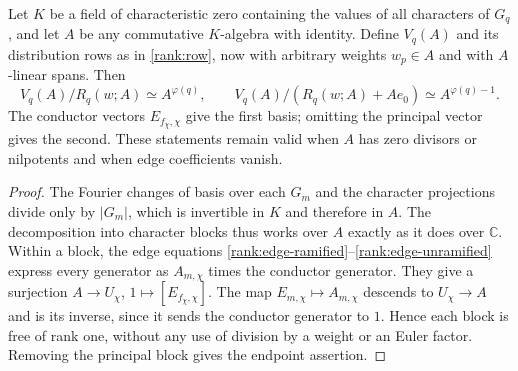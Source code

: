 \begin{theorem}\label{rank:algebra}
Let $K$ be a field of characteristic zero containing the values of all
characters of $G_q$, and let $A$ be any commutative $K$-algebra with
identity.  Define $V_q(A)$ and its distribution rows as in
\eqref{rank:row}, now with arbitrary weights $w_p\in A$ and with
$A$-linear spans.  Then
\[
 V_q(A)/R_q(w;A)\simeq A^{\varphi(q)},\qquad
 V_q(A)/(R_q(w;A)+Ae_0)\simeq A^{\varphi(q)-1}.
\]
The conductor vectors $E_{f_\chi,\chi}$ give the first basis; omitting
the principal vector gives the second.  These statements remain valid
when $A$ has zero divisors or nilpotents and when edge coefficients vanish.
\end{theorem}
\begin{proof}
The Fourier changes of basis over each $G_m$ and the character
projections divide only by $|G_m|$, which is invertible in $K$ and
therefore in $A$.  The decomposition into character blocks thus works
over $A$ exactly as it does over $\mathbb C$.
Within a block, the edge equations
\eqref{rank:edge-ramified}--\eqref{rank:edge-unramified} express every
generator as $A_{m,\chi}$ times the conductor generator.  They give a
surjection $A\to U_\chi$, $1\mapsto[E_{f_\chi,\chi}]$.
The map $E_{m,\chi}\mapsto A_{m,\chi}$ descends to $U_\chi\to A$
and is its inverse, since it sends the conductor generator to $1$.
Hence each block is free of rank one, without any use of division by
a weight or an Euler factor.  Removing the principal block gives the
endpoint assertion.
\end{proof}

